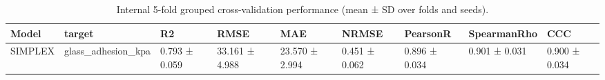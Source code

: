 \begin{table}
\caption{Internal 5-fold grouped cross-validation performance (mean ± SD over folds and seeds).}
\label{tab:internal_cv}
\begin{tabular}{lllllllll}
\toprule
Model & target & R2 & RMSE & MAE & NRMSE & PearsonR & SpearmanRho & CCC \\
\midrule
SIMPLEX & glass\_adhesion\_kpa & 0.793 ± 0.059 & 33.161 ± 4.988 & 23.570 ± 2.994 & 0.451 ± 0.062 & 0.896 ± 0.034 & 0.901 ± 0.031 & 0.900 ± 0.034 \\
\bottomrule
\end{tabular}
\end{table}
